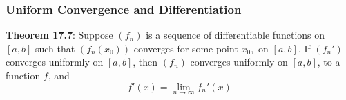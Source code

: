 \documentclass{article}
\theoremstyle{definition}
\begin{document}
\subsubsection*{Uniform Convergence and Differentiation}
\textbf{Theorem 17.7}: Suppose $(f_n)$ is a sequence of differentiable functions on $[a, b]$ such that $(f_n(x_0))$ converges for some point $x_0,$ on $[a, b]$. If $(f_n')$ converges uniformly on $[a, b]$, then $(f_n)$ converges uniformly on $[a, b]$, to a function $f$, and $$f'(x) = \lim_{n \rightarrow \infty} f_n'(x)$$ \\ \\
\end{document}
